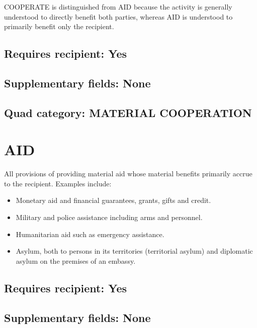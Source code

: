 \documentclass[11pt]{report}
\newcommand{\plcat}[1]{\textsf{#1}}
\begin{document}
\noindent \plcat{COOPERATE} is distinguished from \plcat{AID} because the activity is generally understood to directly benefit both parties, whereas  \plcat{AID} is understood to primarily benefit only the recipient. 

\subsection{Requires recipient: Yes}

\subsection{Supplementary fields: None}

\subsection{Quad category: MATERIAL COOPERATION}


\newpage

\section{AID}

All provisions of providing material aid whose material benefits primarily accrue to the recipient. Examples include: 

\begin{itemize}

\item Monetary aid and financial guarantees, grants, gifts and credit.

\item Military and police assistance including arms and personnel.

\item Humanitarian aid such as emergency assistance.

\item Asylum, both to persons in its territories (territorial asylum) and diplomatic asylum on the premises of an embassy.

\end{itemize}

\subsection{Requires recipient: Yes}

\subsection{Supplementary fields: None}
\end{document}
